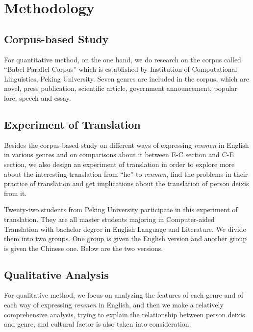 \documentclass[degree=bachelor,language=english]{sysuthesis}
\begin{document}
\chapter{Methodology}

\section{Corpus-based Study}

For quantitative method, on the one hand, we do research on the corpus called “Babel Parallel Corpus” which is established by Institution of Computational Linguistics, Peking University. Seven genres are included in the corpus, which are novel, press publication, scientific article, government announcement, popular lore, speech and essay.



\section{Experiment of Translation}

Besides the corpus-based study on different ways of expressing \emph{renmen} in English in various genres and on comparisons about it between E-C section and C-E section, we also design an experiment of translation in order to explore more about the interesting translation from “he” to \emph{renmen}, find the problems in their practice of translation and get implications about the translation of person deixis from it.

Twenty-two students from Peking University participate in this experiment of translation. They are all master students majoring in Computer-aided Translation with bachelor degree in English Language and Literature. We divide them into two groups. One group is given the English version and another group is given the Chinese one. Below are the two versions.



\section{Qualitative Analysis}

For qualitative method, we focus on analyzing the features of each genre and of each way of expressing \emph{renmen} in English, and then we make a relatively comprehensive analysis, trying to explain the relationship between person deixis and genre, and cultural factor is also taken into consideration.
\end{document}
